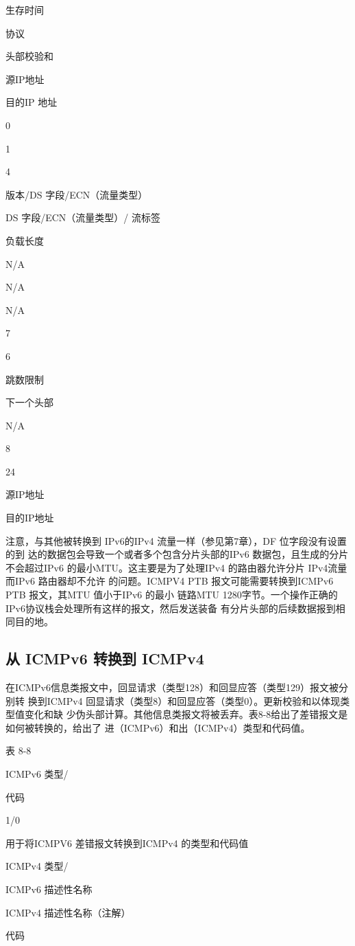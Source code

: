 生存时间

协议

头部校验和

源IP地址

目的IP 地址

0

1

4

版本/DS 字段/ECN（流量类型）

DS 字段/ECN（流量类型）/ 流标签

负载长度

N/A

N/A

N/A

7

6

跳数限制

下一个头部

N/A

8

24

源IP地址

目的IP地址

注意，与其他被转换到 IPv6的IPv4 流量一样（参见第7章），DF 位字段没有设置的到
达的数据包会导致一个或者多个包含分片头部的IPv6 数据包，且生成的分片不会超过IPv6
的最小MTU。这主要是为了处理IPv4 的路由器允许分片 IPv4流量而IPv6 路由器却不允许
的问题。ICMPV4 PTB 报文可能需要转换到ICMPv6 PTB 报文，其MTU 值小于IPv6 的最小
链路MTU 1280字节。一个操作正确的IPv6协议栈会处理所有这样的报文，然后发送装备
有分片头部的后续数据报到相同目的地。

\subsection{从 ICMPv6 转换到 ICMPv4}
在ICMPv6信息类报文中，回显请求（类型128）和回显应答（类型129）报文被分别转
换到ICMPv4 回显请求（类型8）和回显应答（类型0）。更新校验和以体现类型值变化和缺
少伪头部计算。其他信息类报文将被丢弃。表8-8给出了差错报文是如何被转换的，给出了
进（ICMPv6）和出（ICMPv4）类型和代码值。

表 8-8

ICMPv6 类型/

代码

1/0

用于将ICMPV6 差错报文转换到ICMPv4 的类型和代码值

ICMPv4 类型/

ICMPv6 描述性名称

ICMPv4 描述性名称（注解）

代码

